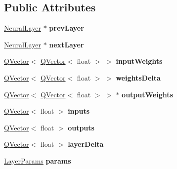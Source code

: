 \subsection*{Public Attributes}
\begin{DoxyCompactItemize}
\item 
\hyperlink{class_neural_layer}{Neural\+Layer} $\ast$ {\bfseries prev\+Layer}\hypertarget{class_neural_layer_a0575450e10a3dfecccb9b567362524a2}{}\label{class_neural_layer_a0575450e10a3dfecccb9b567362524a2}

\item 
\hyperlink{class_neural_layer}{Neural\+Layer} $\ast$ {\bfseries next\+Layer}\hypertarget{class_neural_layer_a071cf761219aecb1d9da97ee44fad3f9}{}\label{class_neural_layer_a071cf761219aecb1d9da97ee44fad3f9}

\item 
\hyperlink{class_q_vector}{Q\+Vector}$<$ \hyperlink{class_q_vector}{Q\+Vector}$<$ float $>$ $>$ {\bfseries input\+Weights}\hypertarget{class_neural_layer_a794bdd594ee597d8a99b215918b9432f}{}\label{class_neural_layer_a794bdd594ee597d8a99b215918b9432f}

\item 
\hyperlink{class_q_vector}{Q\+Vector}$<$ \hyperlink{class_q_vector}{Q\+Vector}$<$ float $>$ $>$ {\bfseries weights\+Delta}\hypertarget{class_neural_layer_ac0aaf690cb59e39d41a12f1539cd36c9}{}\label{class_neural_layer_ac0aaf690cb59e39d41a12f1539cd36c9}

\item 
\hyperlink{class_q_vector}{Q\+Vector}$<$ \hyperlink{class_q_vector}{Q\+Vector}$<$ float $>$ $>$ $\ast$ {\bfseries output\+Weights}\hypertarget{class_neural_layer_a763937d2bd27d69eca03dcc9e3be9a94}{}\label{class_neural_layer_a763937d2bd27d69eca03dcc9e3be9a94}

\item 
\hyperlink{class_q_vector}{Q\+Vector}$<$ float $>$ {\bfseries inputs}\hypertarget{class_neural_layer_a117e02be83ba7a29e138db5d4d9cefdb}{}\label{class_neural_layer_a117e02be83ba7a29e138db5d4d9cefdb}

\item 
\hyperlink{class_q_vector}{Q\+Vector}$<$ float $>$ {\bfseries outputs}\hypertarget{class_neural_layer_aac577824274773371ffd9d2aff6a0d7e}{}\label{class_neural_layer_aac577824274773371ffd9d2aff6a0d7e}

\item 
\hyperlink{class_q_vector}{Q\+Vector}$<$ float $>$ {\bfseries layer\+Delta}\hypertarget{class_neural_layer_a7e9fb43f260d94c21ac7604ac0477367}{}\label{class_neural_layer_a7e9fb43f260d94c21ac7604ac0477367}

\item 
\hyperlink{struct_perceptron_1_1_layer_params}{Layer\+Params} {\bfseries params}\hypertarget{class_neural_layer_af59922df5ffe0e8635e450c271a15ba4}{}\label{class_neural_layer_af59922df5ffe0e8635e450c271a15ba4}

\end{DoxyCompactItemize}
